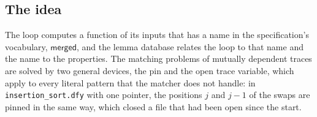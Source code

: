 \subsection{The idea}
The loop computes a function of its inputs that has a name in the specification's vocabulary,
$\mathsf{merged}$, and the lemma database relates the loop to that name and the name to the properties.
The matching problems of mutually dependent traces are solved by two general devices, the pin and the
open trace variable, which apply to every literal pattern that the matcher does not handle: in
\texttt{insertion\_sort.dfy} with one pointer, the positions $j$ and $j - 1$ of the swaps are pinned in
the same way, which closed a file that had been open since the start.

